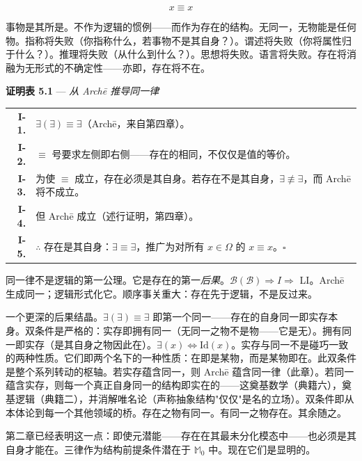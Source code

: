 \documentclass[10pt, openany, oneside]{book}
\renewcommand{\footnotesize}{\fontsize{8.5}{11}\selectfont}
\begin{document}
$$x \equiv x$$

事物是其所是。不作为逻辑的惯例——而作为存在的结构。无同一，无物能是任何物。指称将失败（你指称什么，若事物不是其自身？）。谓述将失败（你将属性归于什么？）。推理将失败（从什么到什么？）。思想将失败。语言将失败。存在将消融为无形式的不确定性——亦即，存在将不在。

\vspace{0.5em}

\textbf{证明表 5.1} --- \textit{从 Arch\={e} 推导同一律}

\vspace{0.5em}

{\footnotesize
\noindent\begin{tabular}{r p{}}
\textbf{I-1.} & $\exists(\exists) \equiv \exists$（Arch\={e}，来自第四章）。\\[0.3em]
\textbf{I-2.} & $\equiv$ 号要求左侧即右侧——存在的相同，不仅仅是值的等价。\\[0.3em]
\textbf{I-3.} & 为使 $\equiv$ 成立，存在必须是其自身。若存在不是其自身，$\exists \not\equiv \exists$，而 Arch\={e} 将不成立。\\[0.3em]
\textbf{I-4.} & 但 Arch\={e} 成立（述行证明，第四章）。\\[0.3em]
\textbf{I-5.} & $\therefore$ 存在是其自身：$\exists \equiv \exists$，推广为对所有 $x \in \Omega$ 的 $x \equiv x$。$\square$ \\[0.3em]
\end{tabular}
}

\vspace{0.8em}

\noindent 同一律不是逻辑的第一公理。它是存在的第一\textit{后果}。$\mathcal{B}(\mathcal{B}) \Rightarrow I \Rightarrow$ LI。Arch\={e} 生成同一；逻辑形式化它。顺序事关重大：存在先于逻辑，不是反过来。

一个更深的后果结晶。$\exists(\exists) \equiv \exists$ 即第一个同一——存在的自身同一即实存本身。双条件是严格的：实存即拥有同一（无同一之物不是物——它是无）。拥有同一即实存（是其自身之物因此在）。$\exists(x) \iff \text{Id}(x)$。实存与同一不是碰巧一致的两种性质。它们即两个名下的一种性质：在即是某物，而是某物即在。此双条件是整个系列转动的枢轴。若实存蕴含同一，则 Arch\={e} 蕴含同一律（此章）。若同一蕴含实存，则每一个真正自身同一的结构即实在的——这奠基数学（典籍六），奠基逻辑（典籍二），并消解唯名论（声称抽象结构"仅仅"是名的立场）。双条件即从本体论到每一个其他领域的桥。存在之物有同一。有同一之物存在。其余随之。

第二章已经表明这一点：即使元潜能——存在在其最未分化模态中——也必须是其自身才能在。三律作为结构前提条件潜在于 $\mathbb{M}_0$ 中。现在它们是显明的。
\end{document}
